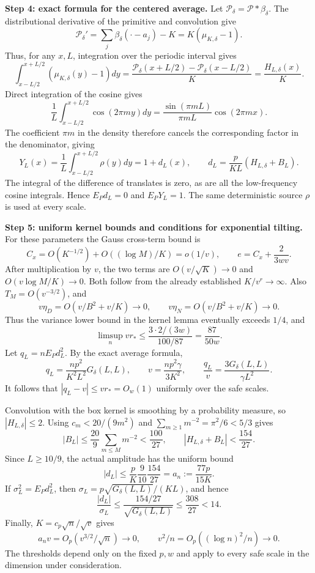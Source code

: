 \documentclass[a4paper,11pt]{article}
\theoremstyle{remark}
\begin{document}
\textbf{Step 4: exact formula for the centered average.}
Let $\mathcal P_\delta=\mathcal P*\beta_\delta$. The distributional
derivative of the primitive and convolution give
\[
 \mathcal P_\delta'=\sum_j\beta_\delta(\cdot-a_j)-K
 =K(\mu_{K,\delta}-1).
\]
Thus, for any $x,L$, integration over the periodic interval gives
\[
 \int_{x-L/2}^{x+L/2}(\mu_{K,\delta}(y)-1)dy
 =\frac{\mathcal P_\delta(x+L/2)-\mathcal P_\delta(x-L/2)}K
 =\frac{H_{L,\delta}(x)}K.
\]
Direct integration of the cosine gives
\[
 \frac1L\int_{x-L/2}^{x+L/2}\cos(2\pi my)dy
 =\frac{\sin(\pi mL)}{\pi mL}\cos(2\pi mx).
\]
The coefficient $\pi m$ in the density therefore cancels the
corresponding factor in the denominator, giving
\begin{equation}\label{eq:papersourceaverage}
 Y_L(x)=\frac1L\int_{x-L/2}^{x+L/2}\rho(y)dy=1+d_L(x),
 \qquad d_L=\frac p{KL}(H_{L,\delta}+B_L).
\end{equation}
The integral of the difference of translates is zero, as are all the
low-frequency cosine integrals. Hence $E_Pd_L=0$ and $E_PY_L=1$.
The same deterministic source $\rho$ is used at every scale.

\textbf{Step 5: uniform kernel bounds and conditions for exponential tilting.}
For these parameters the Gauss cross-term bound is
\[
 C_x=O(K^{-1/2})+O((\log M)/K)=o(1/v),
 \qquad e=C_x+\frac2{3wv}.
\]
After multiplication by $v$, the two terms are
$O(v/\sqrt K)\to0$ and $O(v\log M/K)\to0$. Both follow from the already
established $K/v^r\to\infty$.
Also $T_M=O(v^{-3/2})$, and
\[
 v\eta_D=O(v/B^2+v/K)\to0,
 \qquad v\eta_N=O(v/B^2+v/K)\to0.
\]
Thus the variance lower bound in the kernel lemma eventually exceeds
$1/4$, and
\[
 \limsup_n vr_*
 \le\frac{3\cdot2/(3w)}{100/87}=\frac{87}{50w}.
\]
Let $q_L=nE_Pd_L^2$. By the exact average formula,
\[
 q_L=\frac{np^2}{K^2L^2}G_\delta(L,L),\qquad
 v=\frac{np^2\gamma}{3K^2},\qquad
 \frac{q_L}{v}=\frac{3G_\delta(L,L)}{\gamma L^2}.
\]
It follows that $|q_L-v|\le vr_*=O_w(1)$ uniformly over the safe scales.

Convolution with the box kernel is smoothing by a probability measure,
so $|H_{L,\delta}|\le2$. Using $c_m<20/(9m^2)$ and
$\sum_{m\ge1}m^{-2}=\pi^2/6<5/3$ gives
\[
 |B_L|\le\frac{20}9\sum_{m\le M}m^{-2}<\frac{100}{27},
 \qquad|H_{L,\delta}+B_L|<\frac{154}{27}.
\]
Since $L\ge10/9$, the actual amplitude has the uniform bound
\[
 |d_L|\le\frac pK\frac9{10}\frac{154}{27}
 =a_n:=\frac{77p}{15K}.
\]
If $\sigma_L^2=E_Pd_L^2$, then
$\sigma_L=p\sqrt{G_\delta(L,L)}/(KL)$, and hence
\[
 \frac{|d_L|}{\sigma_L}\le
 \frac{154/27}{\sqrt{G_\delta(L,L)}}\le\frac{308}{27}<14.
\]
Finally, $K=c_p\sqrt n/\sqrt v$ gives
\[
 a_nv=O_p(v^{3/2}/\sqrt n)\to0,
 \qquad v^2/n=O_p((\log n)^2/n)\to0.
\]
The thresholds depend only on the fixed $p,w$ and apply to every safe
scale in the dimension under consideration.
\end{document}
